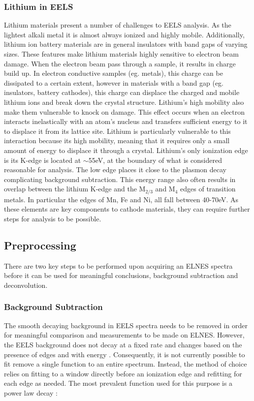 \subsubsection{Lithium in EELS}
Lithium materials present a number of challenges to EELS analysis.  As the lightest alkali metal it is almost always ionized and highly mobile. Additionally, lithium ion battery materials are in general insulators with band gaps of varying sizes. These features make lithium materials highly sensitive to electron beam damage.  When the electron beam pass through a sample, it results in charge build up.  In electron conductive samples (eg. metals), this charge can be dissipated to a certain extent, however in materials with a band gap (eg. insulators, battery cathodes), this charge can displace the charged and mobile lithium ions and break down the crystal structure.  Lithium's high mobility also make them vulnerable to knock on damage.  This effect occurs when an electron interacts inelastically with an atom's nucleus and transfers sufficient energy to it to displace it from its lattice site.  Lithium is particularly vulnerable to this interaction because its high mobility, meaning that it requires only a small amount of energy to displace it through a crystal.  
Lithium's only ionization edge is its K-edge is located at $\mathrm{\sim}$55eV, at the boundary of what is considered reasonable for analysis.  The low edge places it close to the plasmon decay complicating background subtraction.  This energy range also often results in overlap between the lithium K-edge and the $\mathrm{M_{2 / 3}}$ and $\mathrm{M_4}$ edges of transition metals. In particular the edges of Mn, Fe and Ni, all fall between 40-70eV.  As these elements are key components to cathode materials, they can require further steps for analysis to be possible.



\subsection{Preprocessing}

There are two key steps to be performed upon acquiring an ELNES spectra before it can be used for meaningful conclusions, background subtraction and deconvolution. 

\subsubsection{Background Subtraction}
The smooth decaying background in EELS spectra needs to be removed in order for meaningful comparison and measurements to be made on ELNES.  However, the EELS background does not decay at a fixed rate and changes based on the presence of edges and with energy \cite{new_bg}. Consequently, it is not currently possible to fit remove a single function to an entire spectrum.  Instead, the method of choice relies on fitting to a window directly before an ionization edge and refitting for each edge as needed.  The most prevalent function used for this purpose is a power law decay \cite{Egerton}: 

